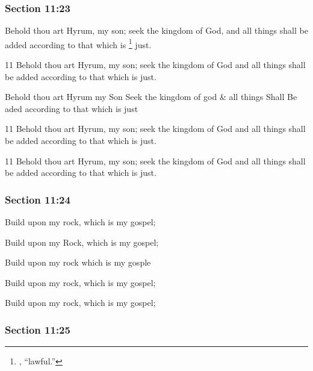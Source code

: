	\subsubsection{Section 11:23} %
		\label{DC11-23}

		Behold thou art Hyrum, my son; seek the kingdom of God, and all things shall be added according to that which is
			\footnote{%
				, ``lawful.''
				}%
		just.

		\begin{framed}
		\scriptsize
			\begin{compactdesc}
				\item[JSP] 11 Behold thou art Hyrum, my son; seek the kingdom of God and all things shall be added according to that which is just. 
				\item[HS] Behold thou art Hyrum my Son Seek the kingdom of god \& all things Shall Be aded according to that which is just 
				\item[DC 1835] 11 Behold thou art Hyrum, my son; seek the kingdom of God and all things shall be added according to that which is just. 
				\item[DC 1844] 11 Behold thou art Hyrum, my son; seek the kingdom of God and all things shall be added according to that which is just.
			\end{compactdesc}
		\end{framed}

	\subsubsection{Section 11:24} %
		\label{DC11-24}

		Build upon my rock, which is my gospel;

		\begin{framed}
		\scriptsize
			\begin{compactdesc}
				\item[JSP] Build upon my Rock, which is my gospel; 
				\item[HS] Build upon my rock which is my gosple 
				\item[DC 1835] Build upon my rock, which is my gospel; 
				\item[DC 1844]  Build upon my rock, which is my gospel; 
			\end{compactdesc}
		\end{framed}

	\subsubsection{Section 11:25} %
		\label{DC11-25}

